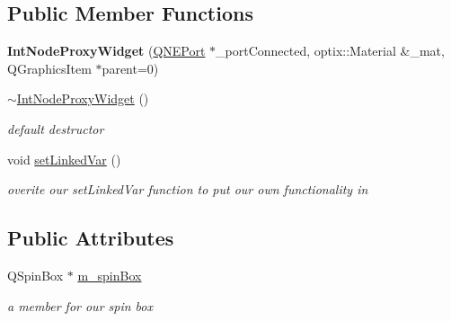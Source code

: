 \subsection*{Public Member Functions}
\begin{DoxyCompactItemize}
\item 
\hypertarget{class_int_node_proxy_widget_a94ec15988e7cc2f2c569ba380aba142d}{{\bfseries Int\-Node\-Proxy\-Widget} (\hyperlink{class_q_n_e_port}{Q\-N\-E\-Port} $\ast$\-\_\-port\-Connected, optix\-::\-Material \&\-\_\-mat, Q\-Graphics\-Item $\ast$parent=0)}\label{class_int_node_proxy_widget_a94ec15988e7cc2f2c569ba380aba142d}

\item 
\hypertarget{class_int_node_proxy_widget_a04f883865fdd60c96084b3dbb61f4051}{\hyperlink{class_int_node_proxy_widget_a04f883865fdd60c96084b3dbb61f4051}{$\sim$\-Int\-Node\-Proxy\-Widget} ()}\label{class_int_node_proxy_widget_a04f883865fdd60c96084b3dbb61f4051}

\begin{DoxyCompactList}\small\item\em default destructor \end{DoxyCompactList}\item 
\hypertarget{class_int_node_proxy_widget_a36821d35f9e61bf34e504c2c6d980388}{void \hyperlink{class_int_node_proxy_widget_a36821d35f9e61bf34e504c2c6d980388}{set\-Linked\-Var} ()}\label{class_int_node_proxy_widget_a36821d35f9e61bf34e504c2c6d980388}

\begin{DoxyCompactList}\small\item\em overite our set\-Linked\-Var function to put our own functionality in \end{DoxyCompactList}\end{DoxyCompactItemize}
\subsection*{Public Attributes}
\begin{DoxyCompactItemize}
\item 
\hypertarget{class_int_node_proxy_widget_aedc2e466a1407c2b3be36e7895b81c5d}{Q\-Spin\-Box $\ast$ \hyperlink{class_int_node_proxy_widget_aedc2e466a1407c2b3be36e7895b81c5d}{m\-\_\-spin\-Box}}\label{class_int_node_proxy_widget_aedc2e466a1407c2b3be36e7895b81c5d}

\begin{DoxyCompactList}\small\item\em a member for our spin box \end{DoxyCompactList}\end{DoxyCompactItemize}
